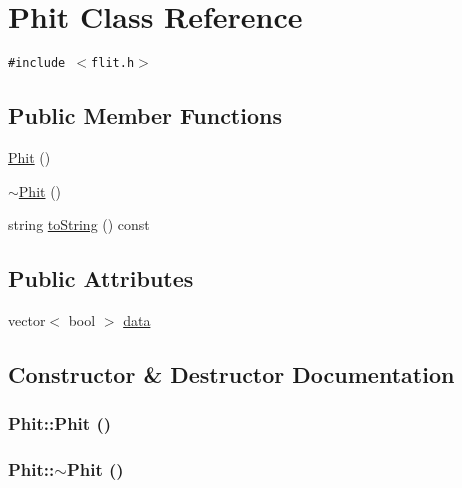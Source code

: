 \hypertarget{classPhit}{
\section{Phit Class Reference}
\label{classPhit}
}
{\tt \#include $<$flit.h$>$}

\subsection*{Public Member Functions}
\begin{CompactItemize}
\item 
\hyperlink{classPhit_ffcfc94e38419efe2318add1830fa3cc}{Phit} ()
\item 
\hyperlink{classPhit_6901e28fe471c2db1597bb2ce8ac25ba}{$\sim$Phit} ()
\item 
string \hyperlink{classPhit_71d43cdc2c23a7788b8724a4b12b261b}{toString} () const 
\end{CompactItemize}
\subsection*{Public Attributes}
\begin{CompactItemize}
\item 
vector$<$ bool $>$ \hyperlink{classPhit_de0670c9ef9f280e53ce73980b785a8c}{data}
\end{CompactItemize}


\subsection{Constructor \& Destructor Documentation}
\hypertarget{classPhit_ffcfc94e38419efe2318add1830fa3cc}{
\subsubsection[{Phit}]{\setlength{\rightskip}{0pt plus 5cm}Phit::Phit ()}}
\label{classPhit_ffcfc94e38419efe2318add1830fa3cc}


\hypertarget{classPhit_6901e28fe471c2db1597bb2ce8ac25ba}{
\subsubsection[{$\sim$Phit}]{\setlength{\rightskip}{0pt plus 5cm}Phit::$\sim$Phit ()}}
\label{classPhit_6901e28fe471c2db1597bb2ce8ac25ba}




